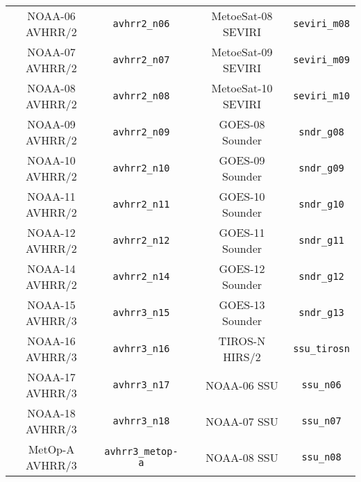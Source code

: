 \begin{table}[htp]
\begin{tabular}{c c c c c}
NOAA-06 AVHRR/2 & \texttt{avhrr2\_n06}             & \hspace{0.2cm} & MetoeSat-08 SEVIRI & \texttt{seviri\_m08}                 \\
NOAA-07 AVHRR/2 & \texttt{avhrr2\_n07}             & \hspace{0.2cm} & MetoeSat-09 SEVIRI & \texttt{seviri\_m09}                 \\
NOAA-08 AVHRR/2 & \texttt{avhrr2\_n08}             & \hspace{0.2cm} & MetoeSat-10 SEVIRI & \texttt{seviri\_m10}                 \\
NOAA-09 AVHRR/2 & \texttt{avhrr2\_n09}             & \hspace{0.2cm} & GOES-08 Sounder & \texttt{sndr\_g08}                      \\
NOAA-10 AVHRR/2 & \texttt{avhrr2\_n10}             & \hspace{0.2cm} & GOES-09 Sounder & \texttt{sndr\_g09}                      \\
NOAA-11 AVHRR/2 & \texttt{avhrr2\_n11}             & \hspace{0.2cm} & GOES-10 Sounder & \texttt{sndr\_g10}                      \\
NOAA-12 AVHRR/2 & \texttt{avhrr2\_n12}             & \hspace{0.2cm} & GOES-11 Sounder & \texttt{sndr\_g11}                      \\
NOAA-14 AVHRR/2 & \texttt{avhrr2\_n14}             & \hspace{0.2cm} & GOES-12 Sounder & \texttt{sndr\_g12}                      \\
NOAA-15 AVHRR/3 & \texttt{avhrr3\_n15}             & \hspace{0.2cm} & GOES-13 Sounder & \texttt{sndr\_g13}                      \\
NOAA-16 AVHRR/3 & \texttt{avhrr3\_n16}             & \hspace{0.2cm} & TIROS-N HIRS/2  & \texttt{ssu\_tirosn}                    \\
NOAA-17 AVHRR/3 & \texttt{avhrr3\_n17}             & \hspace{0.2cm} & NOAA-06 SSU & \texttt{ssu\_n06}                           \\
NOAA-18 AVHRR/3 & \texttt{avhrr3\_n18}             & \hspace{0.2cm} & NOAA-07 SSU & \texttt{ssu\_n07}                           \\
MetOp-A AVHRR/3 & \texttt{avhrr3\_metop-a}         & \hspace{0.2cm} & NOAA-08 SSU & \texttt{ssu\_n08}                           \\

\end{tabular}
\end{table}
